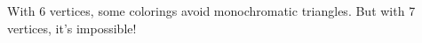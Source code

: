 \documentclass[preview]{standalone}
\begin{document}
\begin{center}
With 6 vertices, some colorings avoid monochromatic triangles. But with 7 vertices, it's impossible!
\end{center}
\end{document}
